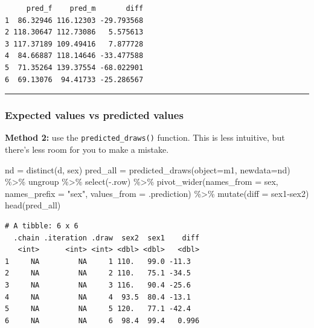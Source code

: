 \documentclass[
  letterpaper,
  DIV=11,
  numbers=noendperiod]{scrartcl}
\newenvironment{Shaded}{\begin{snugshade}}{\end{snugshade}}
\newcommand{\AttributeTok}[1]{\textcolor[rgb]{0.40,0.45,0.13}{#1}}
\newcommand{\FunctionTok}[1]{\textcolor[rgb]{0.28,0.35,0.67}{#1}}
\newcommand{\NormalTok}[1]{\textcolor[rgb]{0.00,0.23,0.31}{#1}}
\newcommand{\OtherTok}[1]{\textcolor[rgb]{0.00,0.23,0.31}{#1}}
\newcommand{\SpecialCharTok}[1]{\textcolor[rgb]{0.37,0.37,0.37}{#1}}
\newcommand{\StringTok}[1]{\textcolor[rgb]{0.13,0.47,0.30}{#1}}
\begin{document}
\begin{verbatim}
     pred_f    pred_m       diff
1  86.32946 116.12303 -29.793568
2 118.30647 112.73086   5.575613
3 117.37189 109.49416   7.877728
4  84.66887 118.14646 -33.477588
5  71.35264 139.37554 -68.022901
6  69.13076  94.41733 -25.286567
\end{verbatim}

\begin{center}\rule{0.5\linewidth}{0.5pt}\end{center}

\subsubsection{Expected values vs predicted
values}\label{expected-values-vs-predicted-values-1}

\textbf{Method 2:} use the \texttt{predicted\_draws()} function. This is
less intuitive, but there's less room for you to make a mistake.

\begin{Shaded}
\begin{Highlighting}[]
\NormalTok{nd }\OtherTok{=} \FunctionTok{distinct}\NormalTok{(d, sex)}
\NormalTok{pred\_all }\OtherTok{=} \FunctionTok{predicted\_draws}\NormalTok{(}\AttributeTok{object=}\NormalTok{m1, }\AttributeTok{newdata=}\NormalTok{nd) }\SpecialCharTok{\%\textgreater{}\%} 
\NormalTok{  ungroup }\SpecialCharTok{\%\textgreater{}\%} \FunctionTok{select}\NormalTok{(}\SpecialCharTok{{-}}\NormalTok{.row) }\SpecialCharTok{\%\textgreater{}\%} 
  \FunctionTok{pivot\_wider}\NormalTok{(}\AttributeTok{names\_from =}\NormalTok{ sex, }\AttributeTok{names\_prefix =} \StringTok{"sex"}\NormalTok{, }\AttributeTok{values\_from =}\NormalTok{ .prediction) }\SpecialCharTok{\%\textgreater{}\%} 
  \FunctionTok{mutate}\NormalTok{(}\AttributeTok{diff =}\NormalTok{ sex1}\SpecialCharTok{{-}}\NormalTok{sex2)}
\FunctionTok{head}\NormalTok{(pred\_all)}
\end{Highlighting}
\end{Shaded}

\begin{verbatim}
# A tibble: 6 x 6
  .chain .iteration .draw  sex2  sex1    diff
   <int>      <int> <int> <dbl> <dbl>   <dbl>
1     NA         NA     1 110.   99.0 -11.3  
2     NA         NA     2 110.   75.1 -34.5  
3     NA         NA     3 116.   90.4 -25.6  
4     NA         NA     4  93.5  80.4 -13.1  
5     NA         NA     5 120.   77.1 -42.4  
6     NA         NA     6  98.4  99.4   0.996
\end{verbatim}
\end{document}

